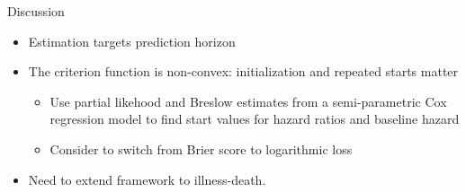 \documentclass{beamer}\usepackage{listings}
\begin{document}
\begin{frame}[label={sec:org524eda4}]{Discussion}
\begin{itemize}
\item Estimation targets prediction horizon
\end{itemize}

\begin{itemize}
\item The criterion function is non-convex: initialization and repeated starts matter
\begin{itemize}
\item Use partial likehood and Breslow estimates from a semi-parametric Cox regression model to find start values for hazard ratios and baseline hazard
\item Consider to switch from Brier score to logarithmic loss
\end{itemize}
\item Need to extend framework to illness-death.
\end{itemize}
\end{frame}
\end{document}
